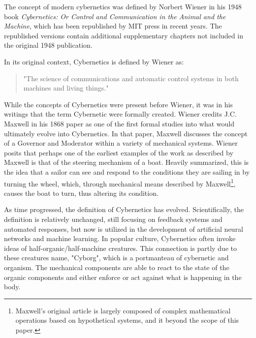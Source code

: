 The concept of modern cybernetics was defined by Norbert Wiener in his 1948 book \textit{Cybernetics: Or Control and Communication in the Animal and the Machine}, which has been republished by MIT press in recent years\cite{WeinerCybernetics2019}. The republished versions contain additional supplementary chapters not included in the original 1948 publication.

In its original context, Cybernetics is defined by Wiener as: 

\begin{quote}
    "The science of communications and automatic control systems in both machines and living things."
\end{quote} 

While the concepts of Cybernetics were present before Wiener, it was in his writings that the term Cybernetic were formally created. Wiener credits J.C. Maxwell in his 1868 paper as one of the first formal studies into what would ultimately evolve into Cybernetics. In that paper, Maxwell discusses the concept of a Governor and Moderator within a variety of mechanical systems\cite{maxwellOnGoverners}. Wiener posits that perhaps one of the earliest examples of the work as described by Maxwell is that of the steering mechanism of a boat\cite{WeinerCybernetics2019}. Heavily summarized, this is the idea that a sailor can see and respond to the conditions they are sailing in by turning the wheel, which, through mechanical means described by Maxwell\footnote{Maxwell's original article is largely composed of complex mathematical operations based on hypothetical systems, and it beyond the scope of this paper.}, causes the boat to turn, thus altering its condition.


As time progressed, the definition of Cybernetics has evolved. Scientifically, the definition is relatively unchanged, still focusing on feedback systems and automated responses, but now is utilized in the development of artificial neural networks and machine learning\cite{Cariani2010}. In popular culture, Cybernetics often invoke ideas of half-organic/half-machine creatures. This connection is partly due to these creatures name, "Cyborg", which is a portmanteau of cybernetic and organism. The mechanical components are able to react to the state of the organic components and either enforce or act against what is happening in the body.

